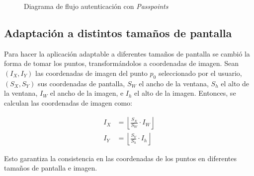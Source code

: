 \begin{figure}[H]
\begin{minipage}[b]{0.42\linewidth}
		\caption{Diagrama de flujo autenticación con \textit{Passpoints}}
		\label{flujo_auth}
	\end{minipage}
		
\end{figure}


\subsection{Adaptaci\'on a distintos tama\~nos de pantalla}
Para hacer la aplicaci\'on adaptable a diferentes tama\~nos de pantalla se cambi\'o la forma de tomar los puntos, transform\'andolos a coordenadas de imagen.
Sean $(I_X, I_Y)$ las coordenadas de imagen del punto $p_0$ seleccionado por el usuario, $(S_X, S_Y)$ sus coordenadas de pantalla, $S_W$ el ancho de la ventana, $S_h$ el alto de la ventana, $I_W$ el ancho de la imagen, e $I_h$ el alto de la imagen. Entonces, se calculan las coordenadas de imagen como:

\begin{align*}
	I_X &= \left\lfloor \frac{S_X}{S_W} \cdot I_W \right\rfloor \\
	I_Y &= \left\lfloor \frac{S_Y}{S_h} \cdot I_h \right\rfloor
\end{align*}

Esto garantiza la consistencia en las coordenadas de los puntos en diferentes tamaños de pantalla e imagen.

